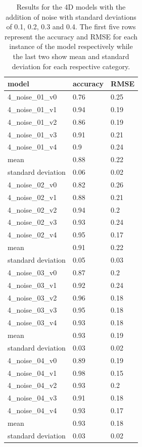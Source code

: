 \begin{table}[!htb]
	\centering
	\caption{Results for the 4D models with the addition of noise with standard deviations of 0.1, 0.2, 0.3 and 0.4. The first five rows represent the accuracy and RMSE for each instance of the model respectively while the last two show mean and standard deviation for each respective category.}
	\begin{tabularx}{\textwidth}{ X  X  X }
		\hline
		model & accuracy & RMSE \\ 
		\hline
		4\_noise\_01\_v0 & 0.76 & 0.25 \\
		4\_noise\_01\_v1 & 0.94 & 0.19 \\
		4\_noise\_01\_v2 & 0.86 & 0.19 \\
		4\_noise\_01\_v3 & 0.91 & 0.21 \\
		4\_noise\_01\_v4 & 0.9  & 0.24 \\ 
		\hline
		mean & 0.88  &  0.22\\
		standard deviation & 0.06 & 0.02 \\
		\hline
		4\_noise\_02\_v0 & 0.82 & 0.26 \\
		4\_noise\_02\_v1 & 0.88 & 0.21 \\
		4\_noise\_02\_v2 & 0.94 & 0.2 \\
		4\_noise\_02\_v3 & 0.93 & 0.24 \\
		4\_noise\_02\_v4 & 0.95 & 0.17 \\ 
		\hline
		mean & 0.91 & 0.22 \\
		standard deviation & 0.05 & 0.03 \\
		\hline
		4\_noise\_03\_v0 & 0.87 & 0.2 \\
		4\_noise\_03\_v1 & 0.92 & 0.24\\
		4\_noise\_03\_v2 & 0.96 & 0.18\\
		4\_noise\_03\_v3 & 0.95 & 0.18\\
		4\_noise\_03\_v4 & 0.93 & 0.18\\
		\hline
		mean & 0.93 & 0.19 \\
		standard deviation & 0.03 & 0.02 \\
		\hline
		4\_noise\_04\_v0 & 0.89 & 0.19 \\
		4\_noise\_04\_v1 & 0.98 & 0.15\\
		4\_noise\_04\_v2 & 0.93 & 0.2\\
		4\_noise\_04\_v3 & 0.91 & 0.18\\
		4\_noise\_04\_v4 & 0.93 & 0.17\\		
		\hline
		mean & 0.93 & 0.18 \\
		standard deviation & 0.03 & 0.02 \\
		\hline 
	\end{tabularx}
	\label{table:4_noise}
\end{table}


